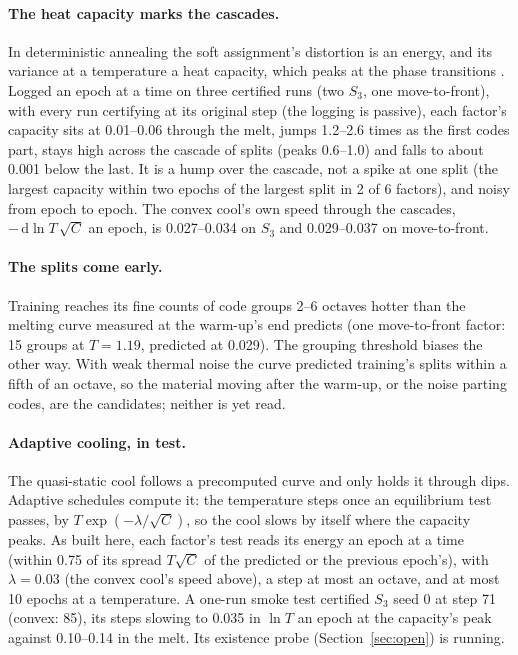 \documentclass[11pt]{article}
\begin{document}
\paragraph{The heat capacity marks the cascades.} In deterministic annealing the soft assignment's
distortion is an energy, and its variance at a temperature a heat capacity, which peaks at the phase
transitions \citep{rose-1998-deterministic-annealing-clustering}. Logged an epoch at a time on three
certified runs (two $S_3$, one move-to-front), with every run certifying at its original step (the
logging is passive), each factor's capacity sits at 0.01--0.06 through the melt, jumps 1.2--2.6 times
as the first codes part, stays high across the cascade of splits (peaks 0.6--1.0) and falls to about
0.001 below the last. It is a hump over the cascade, not a spike at one split (the largest capacity
within two epochs of the largest split in 2 of 6 factors), and noisy from epoch to epoch. The convex
cool's own speed through the cascades, $-\,\mathrm{d}\ln T\,\sqrt{C}$ an epoch, is 0.027--0.034 on
$S_3$ and 0.029--0.037 on move-to-front.

\paragraph{The splits come early.} Training reaches its fine counts of code groups 2--6 octaves
hotter than the melting curve measured at the warm-up's end predicts (one move-to-front factor: 15
groups at $T = 1.19$, predicted at 0.029). The grouping threshold biases the other way. With weak
thermal noise the curve predicted training's splits within a fifth of an octave, so the material
moving after the warm-up, or the noise parting codes, are the candidates; neither is yet read.

\paragraph{Adaptive cooling, in test.} The quasi-static cool follows a precomputed curve and only
holds it through dips. Adaptive schedules \citep{huang-1986-efficient-cooling-schedule,romeo-1989-simulated-annealing-theory-layout}
compute it: the temperature steps once an equilibrium test passes, by $T \exp(-\lambda/\sqrt{C})$, so
the cool slows by itself where the capacity peaks. As built here, each factor's test reads its energy
an epoch at a time (within 0.75 of its spread $T\sqrt{C}$ of the predicted or the previous epoch's),
with $\lambda = 0.03$ (the convex cool's speed above), a step at most an octave, and at most 10 epochs
at a temperature. A one-run smoke test certified $S_3$ seed 0 at step 71 (convex: 85), its steps
slowing to 0.035 in $\ln T$ an epoch at the capacity's peak against 0.10--0.14 in the melt. Its
existence probe (Section~\ref{sec:open}) is running.
\end{document}
